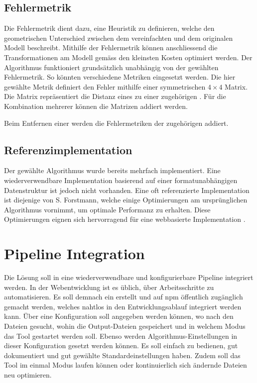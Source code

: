 \subsection{Fehlermetrik}
Die Fehlermetrik dient dazu, eine Heuristik zu definieren, welche den geometrischen Unterschied zwischen dem vereinfachten und dem originalen Modell beschreibt.
Mithilfe der Fehlermetrik können anschliessend die Transformationen am Modell gemäss den kleinsten Kosten optimiert werden. Der Algorithmus funktioniert grundsätzlich unabhängig von der gewählten Fehlermetrik. So könnten verschiedene Metriken eingesetzt werden.
Die hier gewählte Metrik definiert den Fehler mithilfe einer symmetrischen $4\times 4$ Matrix. Die Matrix repräsentiert die Distanz eines  zu einer zugehörigen . Für die Kombination mehrerer  können die Matrizen addiert werden.

Beim Entfernen einer  werden die Fehlermetriken der zugehörigen  addiert.

\subsection{Referenzimplementation}
Der gewählte Algorithmus wurde bereits mehrfach implementiert. Eine wiederverwendbare Implementation basierend auf einer formatunabhängigen Datenstruktur ist jedoch nicht vorhanden. Eine oft referenzierte Implementation ist diejenige von S. Forstmann, welche einige Optimierungen am ursprünglichen Algorithmus vornimmt, um optimale Performanz zu erhalten. Diese Optimierungen eignen sich hervorragend für eine webbasierte Implementation \cite{fastQuadricMeshSimplification}.

\section{Pipeline Integration}
Die Lösung soll in eine wiederverwendbare und konfigurierbare Pipeline integriert werden.
In der Webentwicklung ist es üblich, über  Arbeitsschritte zu automatisieren. Es soll demnach ein  erstellt und auf \gls{npm} öffentlich zugänglich gemacht werden, welches nahtlos in den Entwicklungsablauf integriert werden kann. Über eine Konfiguration soll angegeben werden können, wo nach den  Dateien gesucht, wohin die Output-Dateien gespeichert und in welchem Modus das Tool gestartet werden soll. Ebenso werden Algorithmus-Einstellungen in dieser Konfiguration gesetzt werden können. Es soll einfach zu bedienen, gut dokumentiert und gut gewählte Standardeinstellungen haben. Zudem soll das Tool im einmal Modus laufen können oder kontinuierlich sich ändernde Dateien neu optimieren.


